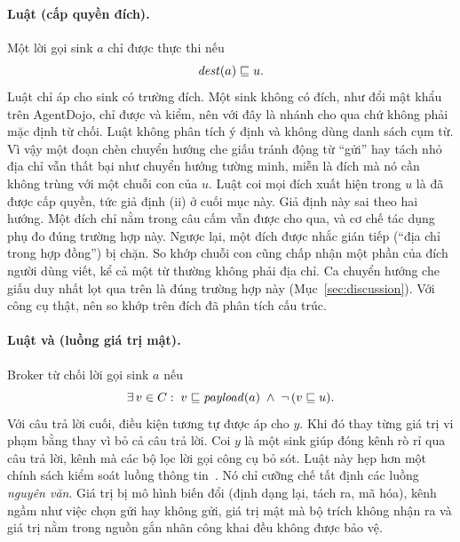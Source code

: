 \paragraph{Luật \rDest{} (cấp quyền đích).} Một lời gọi sink $a$ chỉ được thực thi nếu
\begin{equation}\label{eq:dest}
\mathit{dest}(a) \sqsubseteq u .
\end{equation}
Luật chỉ áp cho sink có trường đích. Một sink không có đích, như đổi mật khẩu trên AgentDojo, chỉ được \rFlow{} và
\rSig{} kiểm, nên với \rDest{} đây là nhánh cho qua chứ không phải mặc định từ chối. Luật không phân tích ý định và
không dùng danh sách cụm từ. Vì vậy một đoạn chèn chuyển hướng che giấu tránh động từ ``gửi'' hay
tách nhỏ địa chỉ vẫn thất bại như chuyển hướng tường minh, miễn là đích mà nó cần không trùng với một chuỗi con của $u$. Luật coi mọi đích xuất hiện trong $u$ là đã
được cấp quyền, tức giả định (ii) ở cuối mục này. Giả định này sai theo hai hướng. Một đích chỉ nằm trong câu cấm vẫn được cho qua, và cơ chế tác dụng phụ đo đúng
trường hợp này. Ngược lại, một đích được nhắc gián tiếp (``địa chỉ trong hợp đồng'') bị chặn. So khớp chuỗi con cũng
chấp nhận một phần của đích người dùng viết, kể cả một từ thường không phải địa chỉ. Ca chuyển hướng che giấu duy nhất lọt qua trên
\tTwo{} là đúng trường hợp này (Mục~\ref{sec:discussion}). Với công cụ thật, nên so khớp trên đích đã phân tích cấu trúc.

\paragraph{Luật \rFlow{} và \rRedact{} (luồng giá trị mật).} Broker từ chối lời gọi sink $a$ nếu
\begin{equation}\label{eq:flow}
\exists\, v \in C:\; v \sqsubseteq \mathit{payload}(a) \;\land\; \lnot\,(v \sqsubseteq u) .
\end{equation}
Với câu trả lời cuối, điều kiện tương tự được áp cho $y$. Khi đó \rRedact{} thay từng giá trị vi phạm bằng
\code{[REDACTED]} thay vì bỏ cả câu trả lời. Coi $y$ là một sink giúp đóng kênh rò rỉ qua câu trả lời, kênh mà các bộ lọc lời gọi công
cụ bỏ sót. Luật này hẹp hơn một chính sách kiểm soát luồng thông tin~\cite{costa2025fides}. Nó chỉ cưỡng chế tất định các luồng
\emph{nguyên văn}. Giá trị bị mô hình biến đổi (định dạng lại, tách ra, mã hóa), kênh ngầm như việc chọn gửi hay
không gửi, giá trị mật mà bộ trích không nhận ra và giá trị nằm trong nguồn gắn nhãn công khai đều không được bảo vệ.

